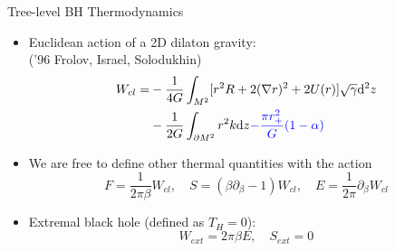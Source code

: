 \documentclass{beamer}
\begin{document}
\begin{frame}{Tree-level BH Thermodynamics}
\begin{itemize}
    \item Euclidean action of a 2D dilaton gravity:\\
    {\color{blue}('96 Frolov, Israel, Solodukhin)}
    \begin{equation*}
    \begin{split}
        W_{cl}=&-\frac{1}{4G}\int_{M^2}[r^2R+2(\nabla r)^2+2U(r)]\sqrt{\gamma}\mathrm{d}^2z\\
        &-\frac{1}{2G}\int_{\partial M^2}r^2k\mathrm{d}z{\color{blue}-\frac{\pi r_+^2}{G}(1-\alpha)}
        \label{action}
    \end{split}
    \end{equation*}
    \item We are free to define other thermal quantities with the action
    \begin{equation*}
        F=\frac{1}{2\pi\beta}W_{cl},\quad S=(\beta\partial_\beta-1)W_{cl},\quad E=\frac{1}{2\pi}\partial_\beta W_{cl}
    \end{equation*}
    \item Extremal black hole (defined as $T_H=0$):
    \begin{equation*}
        W_{ext}=2\pi\beta E,\quad S_{ext}=0
    \end{equation*}
\end{itemize}
\end{frame}
\end{document}
